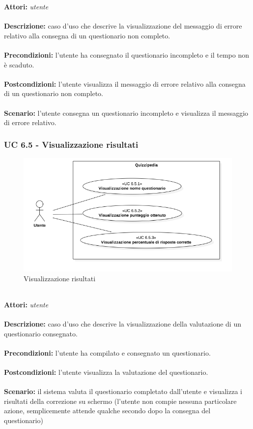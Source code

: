 \documentclass[a4paper,11pt]{article}
\begin{document}
\textbf{Attori:} \textit{utente}
\\ \\
\textbf{Descrizione:} caso d'uso che descrive la visualizzazione del messaggio di errore relativo alla consegna di un questionario non completo.\\
\\
\textbf{Precondizioni:} l'utente ha consegnato il questionario incompleto e il tempo non è scaduto.\\
\\
\textbf{Postcondizioni:} l'utente visualizza il messaggio di errore relativo alla consegna di un questionario non completo.\\
\\
\textbf{Scenario:} l’utente consegna un questionario incompleto e visualizza il messaggio di errore relativo.\\


\subsubsection{UC 6.5 - Visualizzazione risultati}

\begin{figure}[h!]
\centering
\includegraphics[scale=0.6]{../immagini/UC6_5.png}
\caption{Visualizzazione risultati}
\end{figure}
\ \\
\textbf{Attori:} \textit{utente}
\\ \\
\textbf{Descrizione:} caso d'uso che descrive la visualizzazione della valutazione di un questionario consegnato.\\
\\
\textbf{Precondizioni:} l'utente ha compilato e consegnato un questionario.\\
\\
\textbf{Postcondizioni:} l'utente visualizza la valutazione del questionario.\\
\\
\textbf{Scenario:} il sistema valuta il questionario completato dall'utente e visualizza i risultati della correzione su schermo (l'utente non compie nessuna particolare azione, semplicemente attende qualche secondo dopo la consegna del questionario)\\
\end{document}
